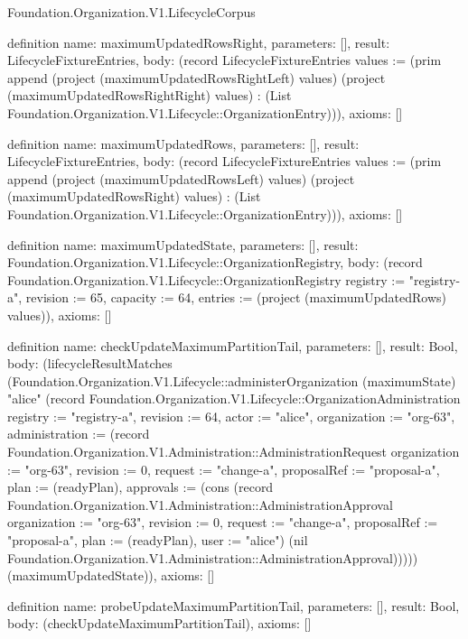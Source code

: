 \begin{lexlean}{Foundation.Organization.V1.LifecycleCorpus}
\begin{semanticmodule}
definition{
  name: maximumUpdatedRowsRight,
  parameters: [],
  result: LifecycleFixtureEntries,
  body: (record LifecycleFixtureEntries {values := (prim append (project (maximumUpdatedRowsRightLeft) values) (project (maximumUpdatedRowsRightRight) values) : (List Foundation.Organization.V1.Lifecycle::OrganizationEntry))}),
  axioms: []
}

definition{
  name: maximumUpdatedRows,
  parameters: [],
  result: LifecycleFixtureEntries,
  body: (record LifecycleFixtureEntries {values := (prim append (project (maximumUpdatedRowsLeft) values) (project (maximumUpdatedRowsRight) values) : (List Foundation.Organization.V1.Lifecycle::OrganizationEntry))}),
  axioms: []
}

definition{
  name: maximumUpdatedState,
  parameters: [],
  result: Foundation.Organization.V1.Lifecycle::OrganizationRegistry,
  body: (record Foundation.Organization.V1.Lifecycle::OrganizationRegistry {registry := "registry-a", revision := 65, capacity := 64, entries := (project (maximumUpdatedRows) values)}),
  axioms: []
}

definition{
  name: checkUpdateMaximumPartitionTail,
  parameters: [],
  result: Bool,
  body: (lifecycleResultMatches (Foundation.Organization.V1.Lifecycle::administerOrganization (maximumState) "alice" (record Foundation.Organization.V1.Lifecycle::OrganizationAdministration {registry := "registry-a", revision := 64, actor := "alice", organization := "org-63", administration := (record Foundation.Organization.V1.Administration::AdministrationRequest {organization := "org-63", revision := 0, request := "change-a", proposalRef := "proposal-a", plan := (readyPlan), approvals := (cons (record Foundation.Organization.V1.Administration::AdministrationApproval {organization := "org-63", revision := 0, request := "change-a", proposalRef := "proposal-a", plan := (readyPlan), user := "alice"}) (nil Foundation.Organization.V1.Administration::AdministrationApproval))})})) (maximumUpdatedState)),
  axioms: []
}

definition{
  name: probeUpdateMaximumPartitionTail,
  parameters: [],
  result: Bool,
  body: (checkUpdateMaximumPartitionTail),
  axioms: []
}
\end{semanticmodule}
\end{lexlean}
